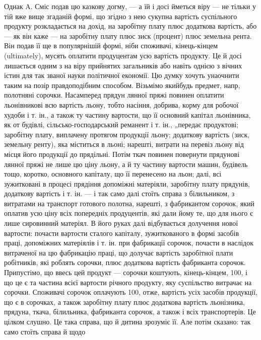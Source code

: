 Однак A. Сміс подав цю казкову догму, — а їй і досі йметься
віру — не тільки у тій вже вище згаданій формі, що згідно з нею сукупна
вартість суспільного продукту розкладається на дохід, на заробітну
плату плюс додаткова вартість, або — як він каже — на заробітну плату
плюс зиск (процент) плюс земельна рента. Він подав її ще в популярнішій
формі, ніби споживачі, кінець-кінцем (ultimately), мусять оплатити
продуцентам усю вартість продукту. Це й досі лишається
одним з на віру прийнятих загальників або навіть однією з вічних істин
для так званої науки політичної економії. Цю думку хочуть унаочнити таким
на позір правдоподібним способом. Візьмімо якийбудь предмет, напр,
полотняні сорочки. Насамперед прядун лянної пряжі повинен оплатити
льонівникові всю вартість льону, тобто насіння, добрива, корму для робочої
худоби і т. ін., а також ту частину вартости, що її основний
капітал льонівника, як от будівлі, сільсько-господарський реманент і т. ін.,
„передає продуктові; заробітну плату, виплачену протягом продукції
льону; додаткову вартість (зиск, земельну ренту), яка міститься в льоні;
нарешті, витрати на перевіз льону від місця його продукції до прядільні.
Потім ткач повинен повернути прядунові лянної пряжі не лише цю
ціну льону, а й ту частину вартости машин, будівель тощо, коротко,
основного капіталу, що її перенесено на льон; далі, всі зужитковані
в процесі прядіння допоміжні матеріяли, заробітну плату прядунів, додаткову
вартість і т. ін. — і так само далі стоїть справа з білильником, з витратами
на транспорт готового полотна, нарешті, з фабрикантом сорочок,
який оплатив усю ціну всіх попередніх продуцентів, які дали йому те,
що для нього є лише сировинний матеріял. В його руках далі відбувається
долучення нової вартости: почасти вартости сталого капіталу, зужиткованого
в формі засобів праці, допоміжних матеріялів і т. ін. при фабрикації
сорочок, почасти в наслідок витраченої на цю фабрикацію праці,
що долучає вартість заробітної плати робітників, які роблять сорочки,
плюс додаткова вартість фабриканта сорочок. Припустімо, що ввесь цей
продукт — сорочки коштують, кінець-кінцем, 100, і що це є
та частина всієї вартости річного продукту, яку суспільство витрачає на
сорочки. Споживачі сорочок оплачують 100, отже, вартість усіх
засобів продукції, що є в сорочках, а також заробітну плату плюс додаткова
вартість льонізника, прядуна, ткача, білильника, фабриканта сорочок,
а також і всіх транспортерів. Це цілком слушно. Це така справа, що й
дитина зрозуміє її. Але потім сказано: так само стоїть справа й щодо
